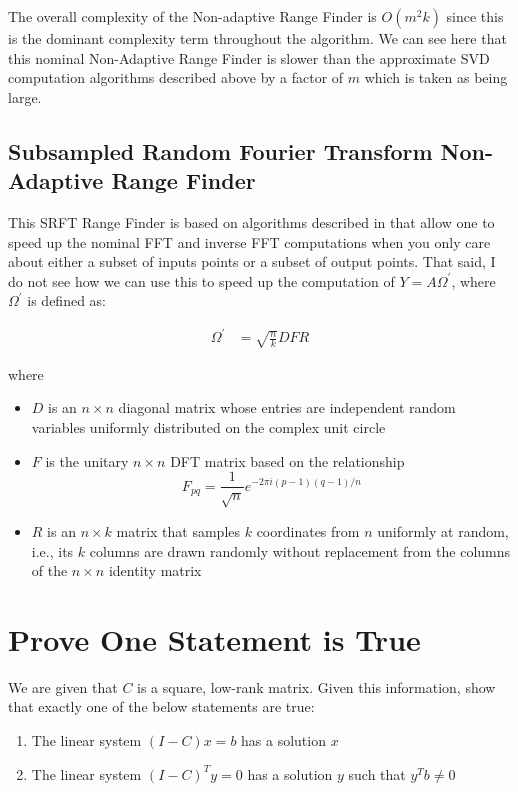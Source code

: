 \documentclass{article}[11pt]
\begin{document}
   The overall complexity of the Non-adaptive Range Finder is $O(m^2 k)$ since this is the dominant complexity term throughout the algorithm. We can see here that this nominal Non-Adaptive Range Finder is slower than the approximate SVD computation algorithms described above by a factor of $m$ which is taken as being large.
   
   \subsection{Subsampled Random Fourier Transform Non-Adaptive Range Finder}
   This SRFT Range Finder is based on algorithms described in \cite{fdft} that allow one to speed up the nominal FFT and inverse FFT computations when you only care about either a subset of inputs points or a subset of output points. That said, I do not see how we can use this to speed up the computation of $Y = A\Omega^{'}$, where $\Omega^{'}$ is defined as:
   
   \begin{align*}
   \Omega^{'} &= \sqrt{\frac{n}{k}} D F R
   \end{align*}
   
   where 
   
   \begin{itemize}
   \item $D$ is an $n \times n$ diagonal matrix whose entries are independent random variables uniformly distributed on the complex unit circle
   \item $F$ is the unitary $n \times n$ DFT matrix based on the relationship \\ $$F_{pq} = \frac{1}{\sqrt{n}} e^{-2\pi i (p-1) (q-1) / n}$$
   \item $R$ is an $n\times k$ matrix that samples $k$ coordinates from $n$ uniformly at random, i.e., its $k$ columns are drawn randomly without replacement from the columns of the $n\times n$ identity matrix
   \end{itemize}
   
   \newpage
   \section{Prove One Statement is True}
   We are given that $C$ is a square, low-rank matrix. Given this information, show that exactly one of the below statements are true:
   
   \begin{enumerate}[label=(\Alph*)]
   \item The linear system $(I-C)x = b$ has a solution $x$
   \item The linear system $(I-C)^Ty = 0$ has a solution $y$ such that $y^Tb \neq 0$
   \end{enumerate}
   
\end{document}
